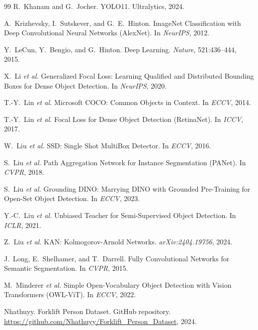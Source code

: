 \begin{thebibliography}{99}
R.~Khanam and G.~Jocher.
\newblock YOLO11.
\newblock Ultralytics, 2024.

A.~Krizhevsky, I.~Sutskever, and G.~E.~Hinton.
\newblock ImageNet Classification with Deep Convolutional Neural Networks (AlexNet).
\newblock In \textit{NeurIPS}, 2012.

Y.~LeCun, Y.~Bengio, and G.~Hinton.
\newblock Deep Learning.
\newblock \textit{Nature}, 521:436--444, 2015.

X.~Li \textit{et al.}
\newblock Generalized Focal Loss: Learning Qualified and Distributed Bounding Boxes for Dense Object Detection.
\newblock In \textit{NeurIPS}, 2020.

T.-Y.~Lin \textit{et al.}
\newblock Microsoft COCO: Common Objects in Context.
\newblock In \textit{ECCV}, 2014.

T.-Y.~Lin \textit{et al.}
\newblock Focal Loss for Dense Object Detection (RetinaNet).
\newblock In \textit{ICCV}, 2017.

W.~Liu \textit{et al.}
\newblock SSD: Single Shot MultiBox Detector.
\newblock In \textit{ECCV}, 2016.

S.~Liu \textit{et al.}
\newblock Path Aggregation Network for Instance Segmentation (PANet).
\newblock In \textit{CVPR}, 2018.

S.~Liu \textit{et al.}
\newblock Grounding DINO: Marrying DINO with Grounded Pre-Training for Open-Set Object Detection.
\newblock In \textit{ECCV}, 2023.

Y.-C.~Liu \textit{et al.}
\newblock Unbiased Teacher for Semi-Supervised Object Detection.
\newblock In \textit{ICLR}, 2021.

Z.~Liu \textit{et al.}
\newblock KAN: Kolmogorov-Arnold Networks.
\newblock \textit{arXiv:2404.19756}, 2024.

J.~Long, E.~Shelhamer, and T.~Darrell.
\newblock Fully Convolutional Networks for Semantic Segmentation.
\newblock In \textit{CVPR}, 2015.

M.~Minderer \textit{et al.}
\newblock Simple Open-Vocabulary Object Detection with Vision Transformers (OWL-ViT).
\newblock In \textit{ECCV}, 2022.

Nhathuyy.
\newblock Forklift Person Dataset.
\newblock GitHub repository. \url{https://github.com/Nhathuyy/Forklift_Person_Dataset}, 2024.


\end{thebibliography}
